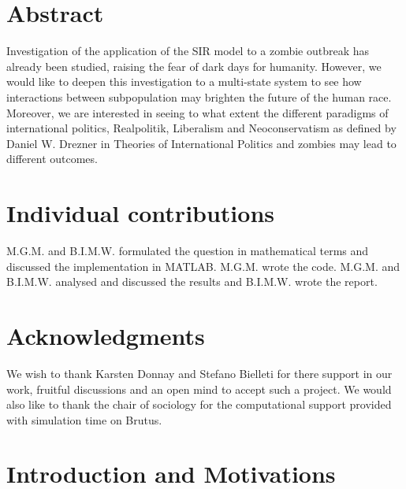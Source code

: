 \documentclass[11pt]{article}
\begin{document}
\section{Abstract}\indent

Investigation of the application of the SIR model to a zombie outbreak has already been studied, raising the fear of dark days for humanity. However, we would like to deepen this investigation to a multi-state system to see how interactions between subpopulation may brighten the future of the human race. Moreover, we are interested in seeing to what extent the different paradigms of international politics, Realpolitik, Liberalism and Neoconservatism as defined by Daniel W. Drezner in Theories of International Politics and zombies may lead to different outcomes.

\section{Individual contributions}\indent

M.G.M. and B.I.M.W. formulated the question in mathematical terms and discussed the implementation in MATLAB. M.G.M. wrote the code. M.G.M. and B.I.M.W. analysed and discussed the results and B.I.M.W. wrote the report.

\section{Acknowledgments}\indent

We wish to thank Karsten Donnay and Stefano Bielleti for there support in our work, fruitful discussions and an open mind to accept such a project. We would also like to thank the chair of sociology for the computational support provided with simulation time on Brutus.

\newpage

\section{Introduction and Motivations}\indent
\end{document}
